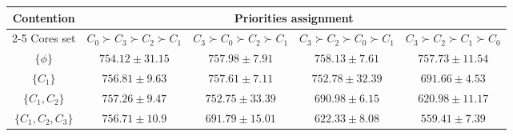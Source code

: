 \begin{tabular}{|c||c|c|c|c|}
    \hline
    \multirow{2}{*}{Contention}               & \multicolumn{4}{c|}{Priorities assignment} \\
    \cline{2-5} %
    Cores set                 & $C_{0} \succ C_{3} \succ C_{2} \succ C_{1}$ & $C_{3} \succ C_{0} \succ C_{2} \succ C_{1}$ & $C_{3} \succ C_{2} \succ C_{0} \succ C_{1}$ & $C_{3} \succ C_{2} \succ C_{1} \succ C_{0}$ \\
    \hline
    \hline
    $\{\phi\}$                & $754.12 \pm 31.15$ & $757.98 \pm 7.91$ & $758.13 \pm 7.61$ & $757.73 \pm 11.54$ \\
    \hline
    $\{C_{1}\}$               & $756.81 \pm 9.63$ & $757.61 \pm 7.11$ & $752.78 \pm 32.39$ & $691.66 \pm 4.53$ \\
    \hline
    $\{C_{1}, C_{2}\}$        & $757.26 \pm 9.47$ & $752.75 \pm 33.39$ & $690.98 \pm 6.15$ & $620.98 \pm 11.17$ \\
    \hline
    $\{C_{1}, C_{2}, C_{3}\}$ & $756.71 \pm 10.9$ & $691.79 \pm 15.01$ & $622.33 \pm 8.08$ & $559.41 \pm 7.39$ \\
    \hline
\end{tabular}
